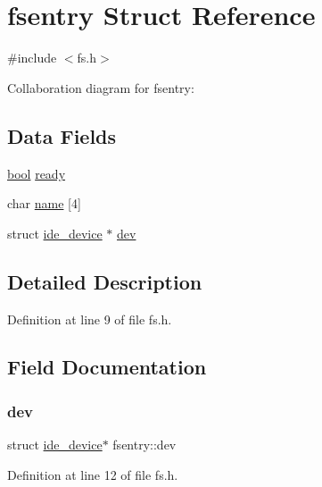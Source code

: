 \hypertarget{a00242}{}\section{fsentry Struct Reference}
\label{a00242}


{\ttfamily \#include $<$fs.\+h$>$}



Collaboration diagram for fsentry\+:
\subsection*{Data Fields}
\begin{DoxyCompactItemize}
\item 
\hyperlink{a00125_af6a258d8f3ee5206d682d799316314b1_af6a258d8f3ee5206d682d799316314b1}{bool} \hyperlink{a00242_a284522ed97fe1eeebd0fcc039b2ea00a_a284522ed97fe1eeebd0fcc039b2ea00a}{ready}
\item 
char \hyperlink{a00242_a9c5a4f5b02eb2c9e9e797f79dc99028a_a9c5a4f5b02eb2c9e9e797f79dc99028a}{name} \mbox{[}4\mbox{]}
\item 
struct \hyperlink{a00194}{ide\+\_\+device} $\ast$ \hyperlink{a00242_aaea66ea744fa50f1c54666033884d8d2_aaea66ea744fa50f1c54666033884d8d2}{dev}
\end{DoxyCompactItemize}


\subsection{Detailed Description}


Definition at line 9 of file fs.\+h.



\subsection{Field Documentation}
\mbox{\label{a00242_aaea66ea744fa50f1c54666033884d8d2_aaea66ea744fa50f1c54666033884d8d2}} 
\subsubsection{\texorpdfstring{dev}{dev}}
{\footnotesize\ttfamily struct \hyperlink{a00194}{ide\+\_\+device}$\ast$ fsentry\+::dev}



Definition at line 12 of file fs.\+h.

